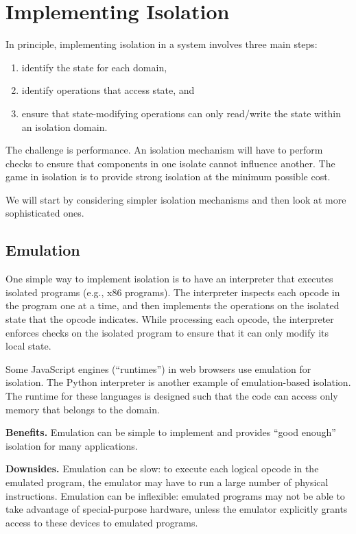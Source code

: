 \documentclass[
  letterpaper,
]{scrbook}
\providecommand{\tightlist}{%
  \setlength{\itemsep}{0pt}\setlength{\parskip}{0pt}}
\theoremstyle{definition}
\theoremstyle{plain}
\theoremstyle{plain}
\theoremstyle{remark}
\begin{document}
\section{Implementing Isolation}\label{implementing-isolation}

In principle, implementing isolation in a system involves three main
steps:

\begin{enumerate}
\def\labelenumi{\arabic{enumi}.}
\tightlist
\item
  identify the state for each domain,
\item
  identify operations that access state, and
\item
  ensure that state-modifying operations can only read/write the state
  within an isolation domain.
\end{enumerate}

The challenge is performance. An isolation mechanism will have to
perform checks to ensure that components in one isolate cannot influence
another. The game in isolation is to provide strong isolation at the
minimum possible cost.

We will start by considering simpler isolation mechanisms and then look
at more sophisticated ones.

\subsection{Emulation}\label{emulation}

One simple way to implement isolation is to have an interpreter that
executes isolated programs (e.g., x86 programs). The interpreter
inspects each opcode in the program one at a time, and then implements
the operations on the isolated state that the opcode indicates. While
processing each opcode, the interpreter enforces checks on the isolated
program to ensure that it can only modify its local state.

Some JavaScript engines (``runtimes'') in web browsers use emulation for
isolation. The Python interpreter is another example of emulation-based
isolation. The runtime for these languages is designed such that the
code can access only memory that belongs to the domain.

\textbf{Benefits.} Emulation can be simple to implement and provides
``good enough'' isolation for many applications.

\textbf{Downsides.} Emulation can be slow: to execute each logical
opcode in the emulated program, the emulator may have to run a large
number of physical instructions. Emulation can be inflexible: emulated
programs may not be able to take advantage of special-purpose hardware,
unless the emulator explicitly grants access to these devices to
emulated programs.
\end{document}

